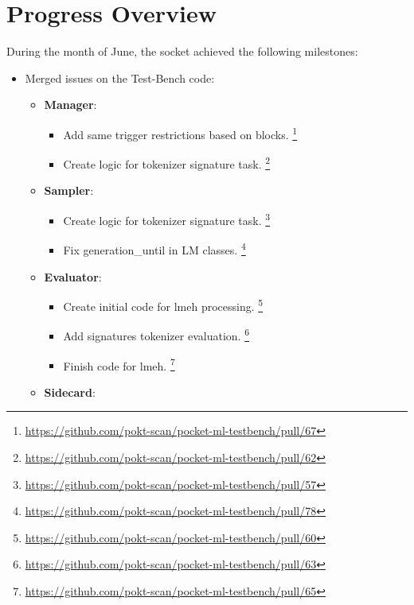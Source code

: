 \section{Progress Overview}\label{sec:a}

During the month of June, the socket achieved the following milestones:

\begin{itemize}[noitemsep]
    \item Merged issues on the Test-Bench code:
    \begin{itemize}[noitemsep]
        \item \textbf{Manager}:
            \begin{itemize}[noitemsep]
                \item Add same trigger restrictions based on blocks. \footnote{\url{https://github.com/pokt-scan/pocket-ml-testbench/pull/67}}
                \item Create logic for tokenizer signature task. \footnote{\url{https://github.com/pokt-scan/pocket-ml-testbench/pull/62}}
            \end{itemize}
        \item \textbf{Sampler}:
            \begin{itemize}[noitemsep]
                \item Create logic for tokenizer signature task. \footnote{\url{https://github.com/pokt-scan/pocket-ml-testbench/pull/57}}
                \item Fix generation\_until in LM classes. \footnote{\url{https://github.com/pokt-scan/pocket-ml-testbench/pull/78}}
            \end{itemize}
        \item \textbf{Evaluator}:
            \begin{itemize}[noitemsep]
                \item Create initial code for lmeh processing. \footnote{\url{https://github.com/pokt-scan/pocket-ml-testbench/pull/60}}
                \item Add signatures tokenizer evaluation. \footnote{\url{https://github.com/pokt-scan/pocket-ml-testbench/pull/63}}
                \item Finish code for lmeh. \footnote{\url{https://github.com/pokt-scan/pocket-ml-testbench/pull/65}}
            \end{itemize}
        \item \textbf{Sidecard}:
            \begin{itemize}[noitemsep]

\end{itemize}
\end{itemize}
\end{itemize}
